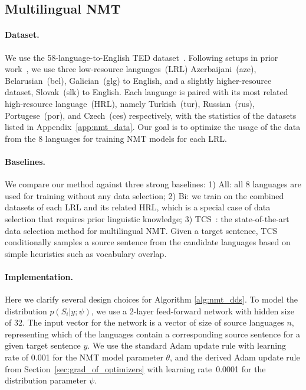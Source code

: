 \subsection{Multilingual NMT}
\paragraph{Dataset.}
We use the 58-language-to-English TED dataset~\citep{ted_pretrain_emb}. 
Following setups in prior work~\citep{ted_pretrain_emb,rapid_adapt_nmt,SDE}, we use three low-resource languages~(LRL) Azerbaijani~(aze), Belarusian~(bel), Galician~(glg) to English,
and a slightly higher-resource dataset, Slovak~(slk) to English. Each language is paired with its most related high-resource language~(HRL), namely Turkish~(tur), Russian~(rus), Portugese~(por), and Czech~(ces) respectively, with the statistics of the datasets listed in Appendix~\ref{app:nmt_data}. Our goal is to optimize the usage of the data from the 8 languages for training NMT models for each LRL. 

\paragraph{Baselines.} We compare our method against three strong baselines: 1) All: all 8 languages are used for training without any data selection; 2) Bi: we train on the combined datasets of each LRL and its related HRL, which is a special case of data selection that requires prior linguistic knowledge; 3) TCS~\citep{TCS}: the state-of-the-art data selection method for multilingual NMT. Given a target sentence, TCS conditionally samples a source sentence from the candidate languages based on simple heuristics such as vocabulary overlap.

\paragraph{Implementation.} Here we clarify several design choices for Algorithm \ref{alg:nmt_dds}. To model the distribution $p(S_i|y;\psi)$, we use a 2-layer feed-forward network with hidden size of 32. The input vector for the network is a vector of size of source languages $n$, representing which of the languages contain a corresponding source sentence for a given target sentence $y$. We use the standard Adam update rule with learning rate of 0.001 for the NMT model parameter $\theta$, and the derived Adam update rule from Section~\ref{sec:grad_of_optimizers} with learning rate~0.0001 for the distribution parameter $\psi$. 

